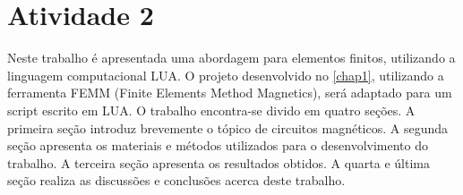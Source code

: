 \chapter{Atividade 2}
\label{chap2}
Neste trabalho é apresentada uma abordagem para elementos finitos, utilizando a linguagem computacional LUA. O projeto desenvolvido no \ref{chap1}, utilizando a ferramenta FEMM (Finite Elements Method Magnetics), será adaptado para um script escrito em LUA. O trabalho encontra-se divido em quatro seções. A primeira seção introduz brevemente o tópico de circuitos magnéticos. A segunda seção apresenta os materiais e métodos utilizados para o desenvolvimento do trabalho. A terceira seção apresenta os resultados obtidos. A quarta e última seção realiza as discussões e conclusões acerca deste trabalho.
\newpage
\pagebreak

\newpage
\pagebreak

\newpage
\pagebreak

\newpage
\pagebreak

